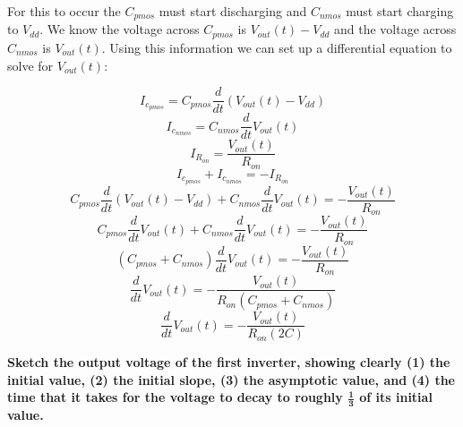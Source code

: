 \begin{enumerate}
{  For this to occur the $C_{pmos}$ must start discharging and $C_{nmos}$ must start charging to $V_{dd}$.
  We know the voltage across $C_{pmos}$ is $V_{out}(t) - V_{dd}$ and the voltage across $C_{nmos}$ is $V_{out}(t)$.
  Using this information we can set up a differential equation to solve for $V_{out}(t)$:

  $$I_{c_{pmos}} = C_{pmos} \frac{d}{dt}(V_{out}(t) - V_{dd}) $$
  $$I_{c_{nmos}} = C_{nmos} \frac{d}{dt}V_{out}(t) $$
  $$I_{R_{on}} = \frac{V_{out}(t)}{R_{on}} $$
  $$I_{c_{pmos}} + I_{c_{nmos}} = -I_{R_{on}} $$
  $$C_{pmos} \frac {d}{dt} (V_{out}(t) - V_{dd}) + C_{nmos} \frac {d}{dt} V_{out}(t) = - \frac {V_{out}(t)}{R_{on}} $$
  $$C_{pmos} \frac {d}{dt} V_{out}(t) + C_{nmos} \frac{d}{dt} V_{out}(t) = - \frac {V_{out} (t)} {R_{on}} $$
  $$(C_{pmos} + C_{nmos}) \frac {d}{dt} V_{out} (t) = - \frac {V_{out}(t)} {R_{on}} $$
  $$\frac {d}{dt} V_{out}(t) = - \frac {V_{out} (t)} {R_{on} (C_{pmos} + C_{nmos})} $$
  $$\frac {d}{dt} V_{out} (t) = - \frac {V_{out} (t)} {R_{on} (2C)}$$
}

\qitem \textbf{Sketch the output voltage of the first inverter, showing clearly (1) the initial value, (2) the initial slope, (3) the asymptotic value, and (4) the time that it takes for the voltage to decay to roughly $\mathbf{\frac{1}{3}}$ of its initial value.}

\end{enumerate}
